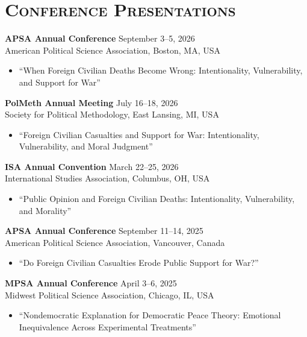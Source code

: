 \documentclass[11pt, letterpaper]{article}
\begin{document}
\section*{\textsc{Conference Presentations}}

\vspace{-2mm}
\textbf{APSA Annual Conference} \hfill September 3--5, 2026\\
American Political Science Association, Boston, MA, USA
\begin{itemize}
\vspace{-1.5mm}
    \item ``When Foreign Civilian Deaths Become Wrong: Intentionality, Vulnerability, and Support for War''
\end{itemize}


\vspace{-2mm}
\textbf{PolMeth Annual Meeting} \hfill July 16--18, 2026\\
Society for Political Methodology, East Lansing, MI, USA
\begin{itemize}
\vspace{-2mm}
    \item ``Foreign Civilian Casualties and Support for War: Intentionality, Vulnerability, and Moral Judgment''
\end{itemize}

\vspace{-2mm}
\textbf{ISA Annual Convention} \hfill March 22--25, 2026\\
International Studies Association, Columbus, OH, USA
\begin{itemize}
\vspace{-2mm}
    \item ``Public Opinion and Foreign Civilian Deaths: Intentionality, Vulnerability, and Morality''
\end{itemize}

\vspace{-1.5mm}
\textbf{APSA Annual Conference} \hfill September 11--14, 2025\\
American Political Science Association, Vancouver, Canada
\begin{itemize}
\vspace{-2mm}
    \item ``Do Foreign Civilian Casualties Erode Public Support for War?''
\end{itemize}

\vspace{-1.5mm}
\textbf{MPSA Annual Conference} \hfill April 3--6, 2025\\
Midwest Political Science Association, Chicago, IL, USA
\begin{itemize}
\vspace{-2mm}
    \item ``Nondemocratic Explanation for Democratic Peace Theory: Emotional Inequivalence Across Experimental Treatments''
\end{itemize}
\end{document}
